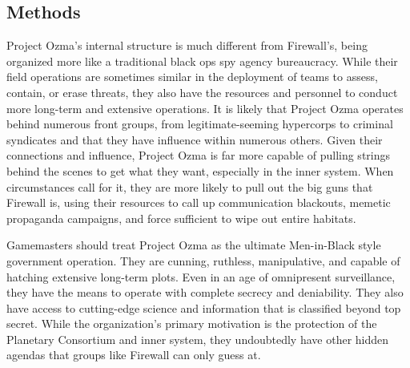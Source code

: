 \subsection{Methods } 

Project Ozma's internal structure is much different from Firewall's, being organized more like a traditional black ops spy agency bureaucracy. While their field operations are sometimes similar in the deployment of teams to assess, contain, or erase threats, they also have the resources and personnel to conduct more long-term and extensive operations. It is likely that Project Ozma operates behind numerous front groups, from legitimate-seeming hypercorps to criminal syndicates and that they have influence within numerous others. Given their connections and influence, Project Ozma is far more capable of pulling strings behind the scenes to get what they want, especially in the inner system. When circumstances call for it, they are more likely to pull out the big guns that Firewall is, using their resources to call up communication blackouts, memetic propaganda campaigns, and force sufficient to wipe out entire habitats. 

Gamemasters should treat Project Ozma as the ultimate Men-in-Black style government operation. They are cunning, ruthless, manipulative, and capable of hatching extensive long-term plots. Even in an age of omnipresent surveillance, they have the means to operate with complete secrecy and deniability. They also have access to cutting-edge science and information that is classified beyond top secret. While the organization's primary motivation is the protection of the Planetary Consortium and inner system, they undoubtedly have other hidden agendas that groups like Firewall can only guess at. 

